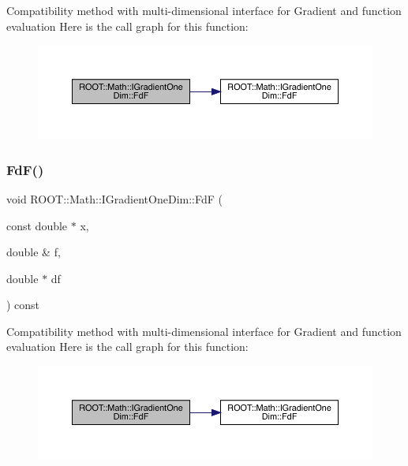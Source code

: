Compatibility method with multi-\/dimensional interface for Gradient and function evaluation Here is the call graph for this function\+:
\nopagebreak
\begin{figure}[H]
\begin{center}
\leavevmode
\includegraphics[width=350pt]{da/d8e/classROOT_1_1Math_1_1IGradientOneDim_a4d51d8a5bfdb547348b6da33008f6a9e_cgraph}
\end{center}
\end{figure}
\mbox{\label{classROOT_1_1Math_1_1IGradientOneDim_a4d51d8a5bfdb547348b6da33008f6a9e}} 
\subsubsection{\texorpdfstring{FdF()}{FdF()}\hspace{0.1cm}{\footnotesize\ttfamily [4/4]}}
{\footnotesize\ttfamily void R\+O\+O\+T\+::\+Math\+::\+I\+Gradient\+One\+Dim\+::\+FdF (\begin{DoxyParamCaption}\item[{const double $\ast$}]{x,  }\item[{double \&}]{f,  }\item[{double $\ast$}]{df }\end{DoxyParamCaption}) const\hspace{0.3cm}{\ttfamily [inline]}}

Compatibility method with multi-\/dimensional interface for Gradient and function evaluation Here is the call graph for this function\+:
\nopagebreak
\begin{figure}[H]
\begin{center}
\leavevmode
\includegraphics[width=350pt]{da/d8e/classROOT_1_1Math_1_1IGradientOneDim_a4d51d8a5bfdb547348b6da33008f6a9e_cgraph}
\end{center}
\end{figure}
\mbox{\label{classROOT_1_1Math_1_1IGradientOneDim_ac00c2cdc7a93ea4358f2f1df8e3499eb}} 
